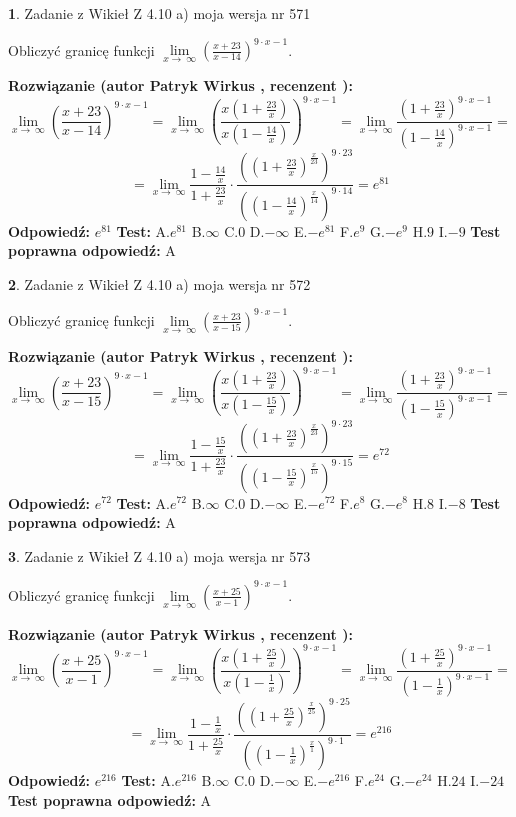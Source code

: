 \documentclass[12pt, a4paper]{article}
\theoremstyle{definition} %
\newtheorem{zad}{}
\newcommand{\zadStart}[1]{\begin{zad}#1\newline}
\newcommand{\zadStop}{\end{zad}}
\newcommand{\rozwStart}[2]{\noindent \textbf{Rozwiązanie (autor #1 , recenzent #2): }\newline}
\newcommand{\rozwStop}{\newline}
\newcommand{\odpStart}{\noindent \textbf{Odpowiedź:}\newline}
\newcommand{\odpStop}{\newline}
\newcommand{\testStart}{\noindent \textbf{Test:}\newline}
\newcommand{\testStop}{\newline}
\newcommand{\kluczStart}{\noindent \textbf{Test poprawna odpowiedź:}\newline}
\newcommand{\kluczStop}{\newline}
\begin{document}
\zadStart{Zadanie z Wikieł Z 4.10 a) moja wersja nr 571}

Obliczyć granicę funkcji  $\lim\limits_{x\to\ \infty}(\frac{x+23}{x-14})^{9\cdot x-1}$.
\zadStop
\rozwStart{Patryk Wirkus}{}
$$\lim\limits_{x\to\ \infty}(\frac{x+23}{x-14})^{9\cdot x-1} = \lim\limits_{x\to\ \infty}(\frac{x(1+\frac{23}{x})}{x(1-\frac{14}{x})})^{9\cdot x-1}=\lim\limits_{x\to\ \infty}\frac{(1+\frac{23}{x})^{9\cdot x-1}}{(1-\frac{14}{x})^{9\cdot x-1}}=$$
$$=\lim\limits_{x\to\ \infty}\frac{1-\frac{14}{x}}{1+\frac{23}{x}}\cdot\frac{((1+\frac{23}{x})^{\frac{x}{23}})^{9\cdot23}}{((1-\frac{14}{x})^{\frac{x}{14}})^{9\cdot14}}=e^{81}$$
\rozwStop
\odpStart
$e^{81}$
\odpStop
\testStart
A.$e^{81}$ B.$\infty$ C.$0$ D.$-\infty$ E.$-e^{81}$
F.$e^{9}$ G.$-e^{9}$
H.$9$
I.$-9$
\testStop
\kluczStart
A
\kluczStop



\zadStart{Zadanie z Wikieł Z 4.10 a) moja wersja nr 572}

Obliczyć granicę funkcji  $\lim\limits_{x\to\ \infty}(\frac{x+23}{x-15})^{9\cdot x-1}$.
\zadStop
\rozwStart{Patryk Wirkus}{}
$$\lim\limits_{x\to\ \infty}(\frac{x+23}{x-15})^{9\cdot x-1} = \lim\limits_{x\to\ \infty}(\frac{x(1+\frac{23}{x})}{x(1-\frac{15}{x})})^{9\cdot x-1}=\lim\limits_{x\to\ \infty}\frac{(1+\frac{23}{x})^{9\cdot x-1}}{(1-\frac{15}{x})^{9\cdot x-1}}=$$
$$=\lim\limits_{x\to\ \infty}\frac{1-\frac{15}{x}}{1+\frac{23}{x}}\cdot\frac{((1+\frac{23}{x})^{\frac{x}{23}})^{9\cdot23}}{((1-\frac{15}{x})^{\frac{x}{15}})^{9\cdot15}}=e^{72}$$
\rozwStop
\odpStart
$e^{72}$
\odpStop
\testStart
A.$e^{72}$ B.$\infty$ C.$0$ D.$-\infty$ E.$-e^{72}$
F.$e^{8}$ G.$-e^{8}$
H.$8$
I.$-8$
\testStop
\kluczStart
A
\kluczStop



\zadStart{Zadanie z Wikieł Z 4.10 a) moja wersja nr 573}

Obliczyć granicę funkcji  $\lim\limits_{x\to\ \infty}(\frac{x+25}{x-1})^{9\cdot x-1}$.
\zadStop
\rozwStart{Patryk Wirkus}{}
$$\lim\limits_{x\to\ \infty}(\frac{x+25}{x-1})^{9\cdot x-1} = \lim\limits_{x\to\ \infty}(\frac{x(1+\frac{25}{x})}{x(1-\frac{1}{x})})^{9\cdot x-1}=\lim\limits_{x\to\ \infty}\frac{(1+\frac{25}{x})^{9\cdot x-1}}{(1-\frac{1}{x})^{9\cdot x-1}}=$$
$$=\lim\limits_{x\to\ \infty}\frac{1-\frac{1}{x}}{1+\frac{25}{x}}\cdot\frac{((1+\frac{25}{x})^{\frac{x}{25}})^{9\cdot25}}{((1-\frac{1}{x})^{\frac{x}{1}})^{9\cdot1}}=e^{216}$$
\rozwStop
\odpStart
$e^{216}$
\odpStop
\testStart
A.$e^{216}$ B.$\infty$ C.$0$ D.$-\infty$ E.$-e^{216}$
F.$e^{24}$ G.$-e^{24}$
H.$24$
I.$-24$
\testStop
\kluczStart
A
\kluczStop
\end{document}
